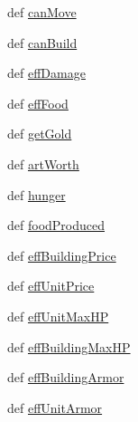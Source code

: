 \begin{CompactItemize}
\item 
def \hyperlink{classBaseAI_1_1BaseAI_95c13bf29ef95817a34f9864906e6d7c}{canMove}
\item 
def \hyperlink{classBaseAI_1_1BaseAI_e8e45448fc6bab4381fa3dd13cde748d}{canBuild}
\item 
def \hyperlink{classBaseAI_1_1BaseAI_a65ecba249b1a0b5e57e1239743a78a1}{effDamage}
\item 
def \hyperlink{classBaseAI_1_1BaseAI_3be07e2721397adc75bb376159e0bae2}{effFood}
\item 
def \hyperlink{classBaseAI_1_1BaseAI_6d1450fe6668e21e1a9e76fb4ed091b4}{getGold}
\item 
def \hyperlink{classBaseAI_1_1BaseAI_96f7fbd41f9da73ab203bc66bfabf290}{artWorth}
\item 
def \hyperlink{classBaseAI_1_1BaseAI_38e07336c6f26c483da30f2098537e1a}{hunger}
\item 
def \hyperlink{classBaseAI_1_1BaseAI_ac24297bd8420f5a88fea0f3d37bef0d}{foodProduced}
\item 
def \hyperlink{classBaseAI_1_1BaseAI_da46b6cfd17f40ab4486661143cf8429}{effBuildingPrice}
\item 
def \hyperlink{classBaseAI_1_1BaseAI_2c1cbac9339eaa991103a57645e15988}{effUnitPrice}
\item 
def \hyperlink{classBaseAI_1_1BaseAI_3ee6663a189eabaa5755c2f2f205c7fd}{effUnitMaxHP}
\item 
def \hyperlink{classBaseAI_1_1BaseAI_cc15a4773a869b4d07cca9f153e4bd03}{effBuildingMaxHP}
\item 
def \hyperlink{classBaseAI_1_1BaseAI_634977ac1854b93727b2bd6298ad2f56}{effBuildingArmor}
\item 
def \hyperlink{classBaseAI_1_1BaseAI_1dd31cd1b03afcc70ce557189d9ee1b5}{effUnitArmor}
\end{CompactItemize}
